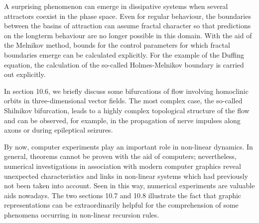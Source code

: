 \documentclass[12pt]{article}
\begin{document}
\hfill


A surprising phenomenon can emerge in dissipative systems when several attractors
coexist in the phase space. Even for regular behaviour, the boundaries between the
basins of attraction can assume fractal character so that predictions on the longterm
behaviour are no longer possible in this domain. With the aid of the Melnikov
method, bounds for the control parameters for which fractal boundaries emerge can
be calculated explicitly. For the example of the Duffing equation, the calculation of
the so-called Holmes-Melnikov boundary is carried out explicitly.

\hfill

In section 10.6, we briefly discuss some bifurcations of flow involving homoclinic
orbits in three-dimensional vector fields. The most complex case, the so-called
Shilnikov bifurcation, leads to a highly complex topological structure of the flow
and can be observed, for example, in the propagation of nerve impulses along axons
or during epileptical seizures.

\hfill

By now, computer experiments play an important role in non-linear dynamics. In
general, theorems cannot be proven with the aid of computers; nevertheless, numerical
investigations in association with modern computer graphics reveal unexpected
characteristics and links in non-linear systems which had previously not been taken
into account. Seen in this way, numerical experiments are valuable aids nowadays.
The two sections 10.7 and 10.8 illustrate the fact that graphic representations can
be extraordinarily helpful for the comprehension of some phenomena occurring in
non-linear recursion rules.

\hfill
\end{document}
